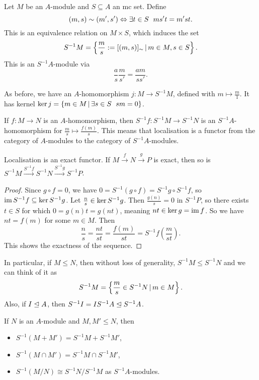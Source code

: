 
Let $M$ be an $A$-module and $S \subseteq A$ an mc set.
Define
\[
  (m, s) \sim (m', s') \Leftrightarrow \exists t \in S \;\  ms't = m'st.
\]
This is an equivalence relation on $M \times S$, which induces the set
\[
  S^{-1} M = \left\{ \frac{m}{s} := [(m,s)]_\sim \,|\, m \in M, s \in S \right\}.
\]
This is an $S^{-1}A$-module via
\[
  \frac{a}{s} \frac{m}{s'} = \frac{am}{ss'}.
\]

As before, we have an $A$-homomorphism $j: M \to S^{-1} M$, defined with $m
\mapsto \frac{m}{1}$.
It has kernel $\operatorname{ker} j = \{ m \in M \,|\, \exists s \in S \;\  sm = 0 \}$.

If $f: M \to N$ is an $A$-homomorphism, then $S^{-1} f: S^{-1}M \to S^{-1}N$ is
an $S^{-1}A$-homomorphism for $\frac{m}{s} \mapsto \frac{f(m)}{s}$.
This means that localisation is a functor from the category of $A$-modules to
the category of $S^{-1}A$-modules.

\begin{proposition}
  Localisation is an exact functor.
  If $M \xrightarrow{f} N \xrightarrow{g} P$ is exact, then so is $S^{-1} M
  \xrightarrow{S^{-1}f} S^{-1}N \xrightarrow{S^{-1}g} S^{-1} P$.
\end{proposition}

\begin{proof}
  Since $g \circ f = 0$, we have $0 = S^{-1}(g \circ f) = S^{-1} g \circ S^{-1}
  f$, so $\operatorname{im} S^{-1} f \subseteq \operatorname{ker} S^{-1} g$.
  Let $\frac{n}{s} \in \operatorname{ker} S^{-1} g$.
  Then $\frac{g(n)}{s} = 0$ in $S^{-1} P$, so there exists $t \in S$ for which
  $0 = g(n) t = g(nt)$, meaning $nt \in \operatorname{ker} g = \operatorname{im} f$.
  So we have $nt = f(m)$ for some $m \in M$.
  Then
  \[
	\frac{n}{s} = \frac{nt}{st} = \frac{f(m)}{st} = S^{-1} f (\frac{m}{st}).
  \]
  This shows the exactness of the sequence.
\end{proof}

In particular, if $M \le N$, then without loss of generality, $S^{-1} M \le
S^{-1} N$ and we can think of it as
\[
  S^{-1} M = \left\{ \frac{m}{s} \in S^{-1} N \,|\, m \in M \right\}.
\]
Also, if $I \trianglelefteq A$, then $S^{-1} I = I S^{-1} A \trianglelefteq S^{-1} A$.

\begin{corollary}
  If $N$ is an $A$-module and $M, M' \le N$, then
  \begin{itemize}
  \item $S^{-1} (M + M') = S^{-1} M + S^{-1} M'$,
  \item $S^{-1}(M \cap M') = S^{-1} M \cap S^{-1} M'$,
  \item $S^{-1}(M/N) \cong S^{-1} N / S^{-1} M$ as $S^{-1}A$-modules.
  \end{itemize}
\end{corollary}

